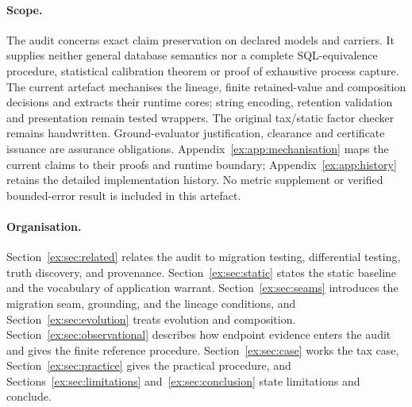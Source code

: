 \documentclass[11pt]{article}
\theoremstyle{definition}
\begin{document}
\paragraph{Scope.}
The audit concerns exact claim preservation on declared models and carriers. It supplies neither general database semantics nor a complete SQL-equivalence procedure, statistical calibration theorem or proof of exhaustive process capture. The current artefact mechanises the lineage, finite retained-value and composition decisions and extracts their runtime cores; string encoding, retention validation and presentation remain tested wrappers. The original tax/static factor checker remains handwritten. Ground-evaluator justification, clearance and certificate issuance are assurance obligations. Appendix~\ref{ex:app:mechanisation} maps the current claims to their proofs and runtime boundary; Appendix~\ref{ex:app:history} retains the detailed implementation history. No metric supplement or verified bounded-error result is included in this artefact.

\paragraph{Organisation.} Section~\ref{ex:sec:related} relates the audit to migration testing, differential testing, truth discovery, and provenance. Section~\ref{ex:sec:static} states the static baseline and the vocabulary of application warrant. Section~\ref{ex:sec:seams} introduces the migration seam, grounding, and the lineage conditions, and Section~\ref{ex:sec:evolution} treats evolution and composition. Section~\ref{ex:sec:observational} describes how endpoint evidence enters the audit and gives the finite reference procedure. Section~\ref{ex:sec:case} works the tax case, Section~\ref{ex:sec:practice} gives the practical procedure, and Sections~\ref{ex:sec:limitations} and~\ref{ex:sec:conclusion} state limitations and conclude.
\end{document}
